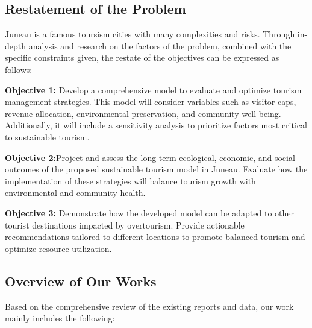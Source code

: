 \documentclass[UTF8]{mcmthesis}
\begin{document}
        \subsection{Restatement of the Problem}
        \hspace*{2em}Juneau is a famous toursism cities with many complexities and risks. Through in-depth analysis and research on the factors of the problem, combined with the specific constraints given, the restate of the objectives can be expressed as follows:


   
           \textbf{Objective 1:} Develop a comprehensive model to evaluate and optimize tourism management strategies. This model will consider variables such as visitor caps, revenue allocation, environmental preservation, and community well-being. Additionally, it will include a sensitivity analysis to prioritize factors most critical to sustainable tourism.

            
           \textbf{Objective 2:}Project and assess the long-term ecological, economic, and social outcomes of the proposed sustainable tourism model in Juneau. Evaluate how the implementation of these strategies will balance tourism growth with environmental and community health.

           
           \textbf{Objective 3:} Demonstrate how the developed model can be adapted to other tourist destinations impacted by overtourism. Provide actionable recommendations tailored to different locations to promote balanced tourism and optimize resource utilization.
           
           \subsection{Overview of Our Works}
           \hspace*{2em} Based on the comprehensive review of the existing reports and data, our work mainly includes the following:
           
\end{document}
